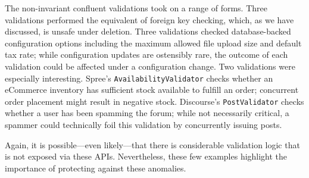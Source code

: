 The non-invariant confluent validations took on a range of
forms. Three validations performed the equivalent of foreign key
checking, which, as we have discussed, is unsafe under deletion. Three
validations checked database-backed configuration options including
the maximum allowed file upload size and default tax rate; while
configuration updates are ostensibly rare, the outcome of each
validation could be affected under a configuration change. Two
validations were especially interesting. Spree's
\texttt{AvailabilityValidator} checks whether an eCommerce inventory
has sufficient stock available to fulfill an order; concurrent order
placement might result in negative stock. Discourse's
\texttt{PostValidator} checks whether a user has been spamming the
forum; while not necessarily critical, a spammer could technically
foil this validation by concurrently issuing posts.

Again, it is possible---even likely---that there is considerable
validation logic that is not exposed via these APIs. Nevertheless,
these few examples highlight the importance of protecting against
these anomalies.


